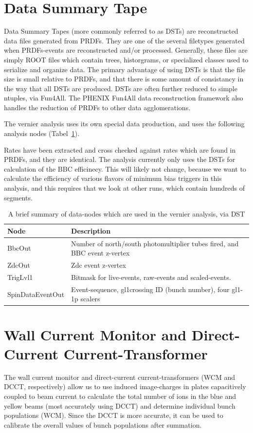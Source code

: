\section{Data Summary Tape}
Data Summary Tapes (more commonly referred to as DSTs) are reconstructed data
files generated from PRDFs. They are one of the several filetypes generated when
PRDFs-events are reconstructed and/or processed. Generally, these files are
simply ROOT files which contain trees, historgrams, or specialized classes used
to serialize and organize data.  The primary advantage of using DSTs is that the
file size is small relative to PRDFs, and that there is some amount of
consistancy in the way that all DSTs are produced. DSTs are often further
reduced to simple ntuples, via Fun4All. The PHENIX Fun4All data reconstruction
framework also handles the reduction of PRDFs to other data agglomerations.

The vernier analysis uses its own special data production, and uses the
following analysis
nodes (Tabel~\ref{tab:dstnodes}).

Rates have been extracted and cross checked against rates which are found in
PRDFs, and they are identical. The analysis currently only uses the DSTs for
calculation of the BBC efficinecy. This will likely not change, because we want
to calculate the efficiency of various flavors of minimum bias triggers in this
analysis, and this requires that we look at other runs, which contain hundreds
of segments. 

\begin{table}
  \centering
  \begin{tabular}{ l p{6cm} }
    \toprule
    \textbf{Node} & \textbf{Description} \\
    \midrule 
    BbcOut           & Number of north/south photomultiplier tubes fired, and BBC event z-vertex \\
    ZdcOut           & Zdc event z-vertex  \\
    TrigLvl1         & Bitmask for live-events, raw-events and scaled-events. \\
    SpinDataEventOut & Event-sequence, gl1crossing ID (bunch number), four gl1-1p scalers \\
    \bottomrule
  \end{tabular}
  \caption{ A brief summary of data-nodes which are used in the vernier analysis, via DST }
  \label{tab:dstnodes}
\end{table}

\section{Wall Current Monitor and Direct-Current Current-Transformer}
The wall current monitor and direct-current current-transformers (WCM and DCCT,
respectively) allow us to use induced image-charges in plates capacitively
coupled to beam current to calculate the total number of ions in the blue and
yellow beams (most accurately using DCCT) and determine individual bunch
populations (WCM). Since the DCCT is more accurate, it can be used to calibrate
the overall values of bunch populations after summation.

